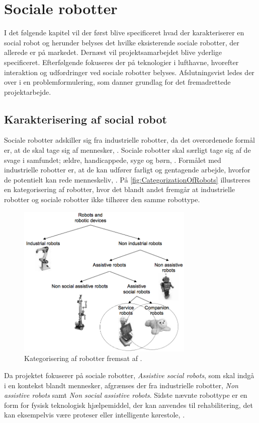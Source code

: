 \chapter{Sociale robotter}
\label{SocialRobot}
%
I det følgende kapitel vil der først blive specificeret hvad der karakteriserer en social robot og herunder belyses det hvilke eksisterende sociale robotter, der allerede er på markedet. Dernæst vil projektsamarbejdet blive yderlige specificeret. Efterfølgende fokuseres der på teknologier i lufthavne, hvorefter interaktion og udfordringer ved sociale robotter belyses. Afslutningsvist ledes der over i en problemformulering, som danner grundlag for det fremadrettede projektarbejde.
%
\section{Karakterisering af social robot}
\label{KarakteriseringAfSocialRobot}
%
Sociale robotter adskiller sig fra industrielle robotter, da det overordenede formål er, at de skal tage sig af mennesker, \parencite[s. 13]{PDF:RobotShiftFromIPtoSR}. Sociale robotter skal særligt tage sig af de svage i samfundet; ældre, handicappede, syge og børn, \parencite[s. 14]{PDF:RobotShiftFromIPtoSR}. Formålet med industrielle robotter er, at de kan udfører farligt og gentagende arbejde, hvorfor de potentielt kan rede menneskeliv, \parencite[ss. 12-13]{PDF:RobotShiftFromIPtoSR}. På \autoref{fig:CategorizationOfRobots} illustreres en kategorisering af robotter, hvor det blandt andet fremgår at industrielle robotter og sociale robotter ikke tilhører den samme robottype.    
%
\begin{figure}[H]
\centering
\includegraphics[width = 0.75\textwidth]{Figure/CategorizationOfRobots} 
\caption{Kategorisering af robotter fremsat af \textcite[s. 13]{PDF:AssesingAcceptance}.}
\label{fig:CategorizationOfRobots}
\end{figure}
\noindent 
%
Da projektet fokuserer på sociale robotter, \textit{Assistive social robots}, som skal indgå i en kontekst blandt mennesker, afgrænses der fra industrielle robotter, \textit{Non assistive robots} samt \textit{Non social assistive robots}. Sidste nævnte robottype er en form for fysisk teknologisk hjælpemiddel, der kan anvendes til rehabilitering, det kan eksempelvis være proteser eller intelligente kørestole, \parencite[s. 12]{PDF:AssesingAcceptance}.    


